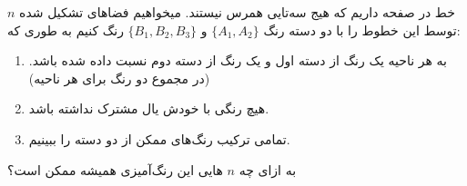$n$ خط در صفحه داریم که هیج سه‌تایی همرس نیستند.
میخواهیم فضاهای تشکیل شده توسط این خطوط را با دو دسته رنگ 
$\{A_1, A_2\}$ و $\{B_1, B_2, B_3\}$ رنگ کنیم به طوری که:
\begin{enumerate}
    \item به هر ناحیه یک رنگ از دسته اول و یک رنگ از دسته دوم نسبت داده شده باشد. (در مجموع دو رنگ برای هر ناحیه)
    \item هیچ رنگی با خودش یال مشترک نداشته باشد.
    \item تمامی ترکیب رنگ‌های ممکن از دو دسته را ببینیم.
\end{enumerate}
به ازای چه $n$ هایی این رنگ‌آمیزی همیشه ممکن است؟